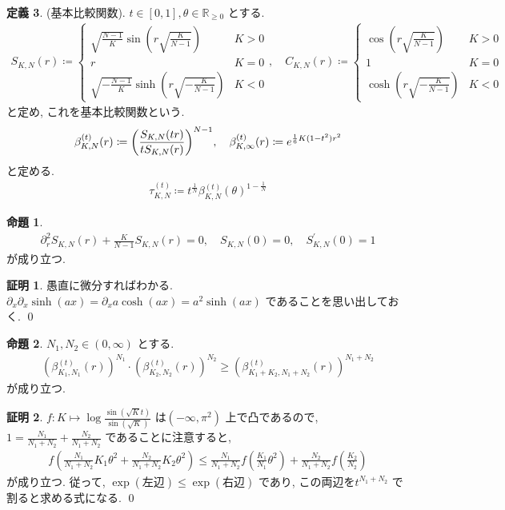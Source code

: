 \documentclass[10pt, fleqn, label-section=none]{bxjsarticle}
\theoremstyle{definition}
\newtheorem{dfn}{定義}[section]
\newtheorem{prop}[dfn]{命題}
\newtheorem*{pf*}{証明}
\newcommand{\paren}[1]{\mleft( #1\mright )}
\renewcommand{\;}{\, ; \,}
\begin{document}
\begin{dfn}(基本比較関数). $t \in [0,1], \theta \in \mathbb R_{\geq 0}$ とする. 
\begin{align*} S_{K,N}(r) \coloneqq \begin{cases} \sqrt{  \frac{N-1}{K}} \sin(r\sqrt{\frac{K}{N-1}}) & K >0 \\ r & K = 0 \\ \sqrt{- \frac{N-1}{K}} \sinh(r\sqrt{ - \frac{K}{N-1}})  & K < 0 \end{cases}, \quad C_{K,N}(r) \coloneqq \begin{cases}  \cos(r\sqrt{\frac{K}{N-1}}) & K >0 \\ 1 & K = 0 \\  \cosh(r\sqrt{ - \frac{K}{N-1}})  & K < 0 \end{cases} \end{align*}
と定め, これを基本比較関数という.
\begin{align*}   \beta_{K,N}^{(t)} (r)      \coloneqq \paren{\frac{S_{K,N}(tr) }{t S_{K,N} (r)}}^{N-1}  , \quad \beta_{K, \infty}^{(t)} (r) \coloneqq e^{ \frac{1}{6}  K(1-t^2)r^2   } \end{align*}
と定める. 
\begin{align*} \tau_{K,N}^{(t)} \coloneqq     t^\frac{1}{N}     \beta_{K,N}^{(t)}(\theta)^{1 - \frac{1}{N}}      \end{align*}

\begin{prop}
\begin{align*} \partial^2_r  S_{K,N}(r) + \frac{K}{N-1} S_{K,N}(r) = 0, \quad S_{K,N}(0) = 0, \quad S^\prime_{K,N}(0) = 1 \end{align*}
が成り立つ. 
\end{prop}
\begin{pf*}
愚直に微分すればわかる. $\partial_x \partial_x \sinh (ax) = \partial_x  a \cosh(ax) = a^2 \sinh(ax)$ であることを思い出しておく. 
\qed
\end{pf*}

\begin{prop}$N_1, N_2 \in (0, \infty)$ とする. 
\begin{align*} (\beta_{K_1, N_1}^{(t)} (r) )^{N_1} \cdot (\beta_{K_2, N_2}^{(t)} (r) )^{N_2} \geq (\beta_{K_1 + K_2, N_1 + N_2}^{(t)} (r) )^{N_1 + N_2}     \end{align*}
が成り立つ. 
\end{prop}
\begin{pf*}
$f: K \mapsto \log \frac{\sin(\sqrt K t)}{\sin (\sqrt K)}$ は$(-\infty, \pi^2)$ 上で凸であるので, $1 = \frac{N_1}{N_1 + N_2} + \frac{N_2}{N_1 + N_2}$ であることに注意すると, 
\begin{align*} f(\frac{N_1}{N_1 + N_2} K_1 \theta^2 + \frac{N_2}{N_1 + N_2} K_2 \theta^2 )\leq \frac{N_1}{N_1 + N_2} f(\frac{K_1}{N_1} \theta ^2 ) + \frac{N_2}{N_1 + N_2} f(\frac{K_2}{N_2})   \end{align*}
が成り立つ. 従って, $\exp (\textrm{左辺}) \leq \exp(\textrm{右辺})$ であり, この両辺を$t^{N_1 + N_2}$ で割ると求める式になる. 
\qed
\end{pf*}


\end{dfn}
\end{document}
